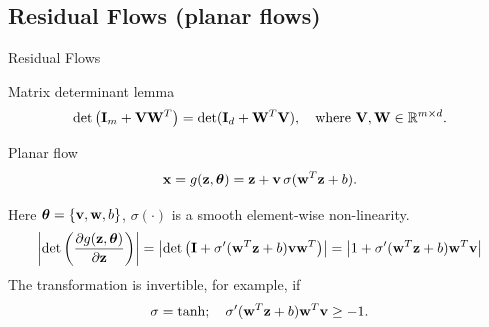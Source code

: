 \subsection{Residual Flows (planar flows)}
\begin{frame}{Residual Flows}
	\begin{block}{Matrix determinant lemma}
		\vspace{-0.5cm}
		\[
		\det \left( \mathbf{I}_m + \mathbf{V} \mathbf{W}^T \right) = \det ( \mathbf{I}_d + \mathbf{W}^T \mathbf{V} ), \quad \text{where } \mathbf{V}, \mathbf{W} \in \mathbb{R}^{m \times d}.
		\]
		\vspace{-0.5cm}
	\end{block}
	\begin{block}{Planar flow}
		\vspace{-0.2cm}
		\[
		\mathbf{x} = g(\mathbf{z}, \boldsymbol{\theta}) = \mathbf{z} + \mathbf{v} \, \sigma(\mathbf{w}^T\mathbf{z} + b).
		\]
		\vspace{-0.3cm}
	\end{block}
	Here $\boldsymbol{\theta} = \{\mathbf{v}, \mathbf{w}, b\}$, $\sigma(\cdot)$ is a smooth element-wise non-linearity.
	{\small
		\[
		\left| \det \left( \frac{\partial g(\mathbf{z}, \boldsymbol{\theta})}{\partial \mathbf{z}} \right)\right| = \left| \det \left( \mathbf{I} + \sigma'(\mathbf{w}^T \mathbf{z} + b) \mathbf{v} \mathbf{w}^T\right) \right| = \left| 1 + \sigma'(\mathbf{w}^T \mathbf{z} + b) \mathbf{w}^T \mathbf{v} \right|
		\]}
	The transformation is invertible, for example, if
	\[
	\sigma = \tanh; \quad \sigma'(\mathbf{w}^T \mathbf{z} + b) \mathbf{w}^T \mathbf{v} \geq -1.
	\]
\end{frame}
